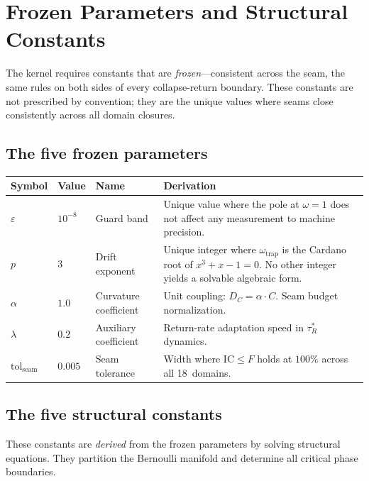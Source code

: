 \documentclass[
  aps,
  prd,
  twocolumn,
  superscriptaddress,
  nofootinbib,
  floatfix
]{revtex4-2}
\newcommand{\tRS}{\tau_{\!R}^{*}}
\newcommand{\eps}{\varepsilon}
\newcommand{\tolseam}{\mathrm{tol}_{\mathrm{seam}}}
\newcommand{\IC}{\mathrm{IC}}
\begin{document}
\section{Frozen Parameters and Structural Constants}
\label{sec:frozen}

The kernel requires constants that are \emph{frozen}---consistent
across the seam, the same rules on both sides of every
collapse-return boundary.  These constants are not prescribed by
convention; they are the unique values where seams close
consistently across all domain closures.

\subsection{The five frozen parameters}

{\small
\begin{center}
\begin{tabular}{@{}lllP{3.0cm}@{}}
\toprule
Symbol & Value & Name & Derivation \\
\midrule
$\eps$ & $10^{-8}$ & Guard band &
  Unique value where the pole at $\omega = 1$ does not affect
  any measurement to machine precision. \\[0.5em]
$p$ & $3$ & Drift exponent &
  Unique integer where $\omega_{\mathrm{trap}}$ is the Cardano
  root of $x^3 + x - 1 = 0$. No other integer yields a solvable
  algebraic form. \\[0.5em]
$\alpha$ & $1.0$ & Curvature coefficient &
  Unit coupling: $D_C = \alpha \cdot C$.  Seam budget
  normalization. \\[0.5em]
$\lambda$ & $0.2$ & Auxiliary coefficient &
  Return-rate adaptation speed in $\tRS$ dynamics. \\[0.5em]
$\tolseam$ & $0.005$ & Seam tolerance &
  Width where $\IC \leq F$ holds at $100\%$ across all
  18~domains. \\
\bottomrule
\end{tabular}
\end{center}}

\subsection{The five structural constants}

These constants are \emph{derived} from the frozen parameters by
solving structural equations.  They partition the Bernoulli manifold
and determine all critical phase boundaries.
\end{document}
